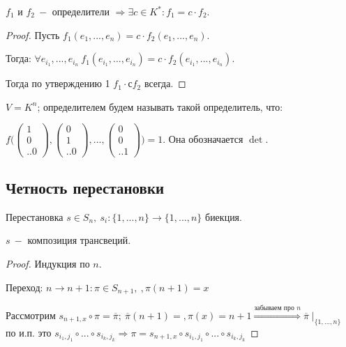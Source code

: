\begin{theorem}
    $f_1$ и $f_2\ -$ определители $\Rightarrow \exists c\in K^*:f_1=c\cdot f_2$.
\end{theorem}

\begin{proof}
    Пусть $f_1(e_1,...,e_n)=c\cdot f_2(e_1,...,e_n)$.

    Тогда: $\forall e_{i_1},...,e_{i_n}\ f_1(e_{i_1},...,e_{i_n})= c\cdot f_2(e_{i_1},...,e_{i_n})$.

    Тогда по утверждению 1 $f_1 \cdot сf_2$ всегда.
\end{proof}

\begin{definition}
    $V=K^n$; определителем будем называть такой определитель, что:

    $f\bigg(\begin{pmatrix}
                1 \\ 0 \\ .. 0
    \end{pmatrix}, \begin{pmatrix}
                       0 \\ 1 \\ .. 0
    \end{pmatrix}, ..., \begin{pmatrix}
                            0 \\ 0 \\ .. 1
    \end{pmatrix} \bigg)=1$. Она обозначается $\det$.
\end{definition}


\subsection{Четность перестановки}
\begin{definition}
    Перестановка $s\in S_n,\ s_i:\{1,...,n\}\rightarrow \{1,...,n\}$ биекция.
\end{definition}

\begin{statement}
    $s\ -$ композиция трансвеций.
\end{statement}

\begin{proof}
    Индукция по $n$.

    Переход: $n\rightarrow n + 1:\pi\in S_{n+1},\ ,\pi(n+1)=x$

    Рассмотрим $s_{n+1, x}\circ \pi=\overline{\pi};\ \overline{\pi}(n+1)=,\pi(x)=n+1\overset{\text{забываем про $n$}}{\Rightarrow}\overline{\pi}\mid_{\{1,...,n\}}$ по и.п. это $s_{i_1,j_1}\circ...\circ s_{i_k,j_k}\Rightarrow \pi = s_{n+1,x}\circ s_{i_1,j_1}\circ...\circ s_{i_k, j_k}$
\end{proof}

